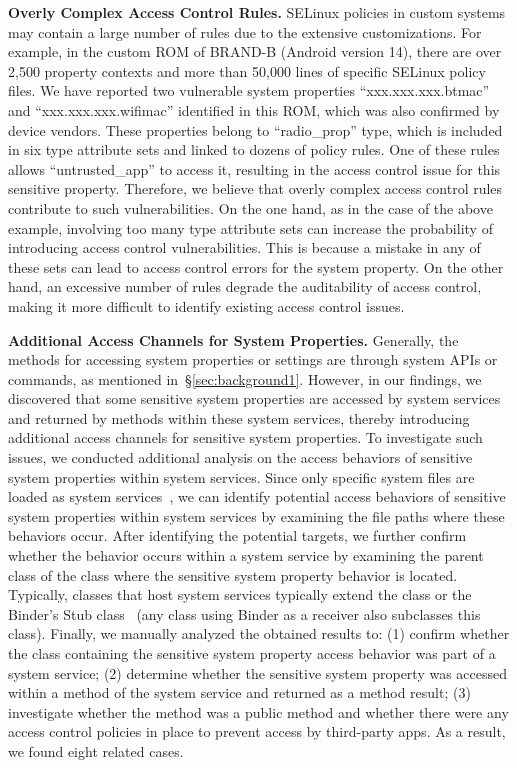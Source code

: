 \noindent \textbf{Overly Complex Access Control Rules.}
SELinux policies in custom systems may contain a large number of rules due to the extensive customizations.
For example, in the custom ROM of BRAND-B (Android version 14), there are over 2,500 property contexts and more than 50,000 lines of specific SELinux policy files.
We have reported two vulnerable system properties ``xxx.xxx.xxx.btmac'' and ``xxx.xxx.xxx.wifimac'' identified in this ROM, which was also confirmed by device vendors.
These properties belong to ``radio\_prop'' type, which is included in six type attribute sets and linked to dozens of policy rules.
One of these rules allows ``untrusted\_app'' to access it, resulting in the access control issue for this sensitive property.
Therefore, we believe that overly complex access control rules contribute to such vulnerabilities.
On the one hand, as in the case of the above example, involving too many type attribute sets can increase the probability of introducing access control vulnerabilities. 
This is because a mistake in any of these sets can lead to access control errors for the system property. 
On the other hand, an excessive number of rules degrade the auditability of access control, making it more difficult to identify existing access control issues.

\noindent \textbf{Additional Access Channels for System Properties.}
Generally, the methods for accessing system properties or settings are through system APIs or commands, as mentioned in~\S\ref{sec:background1}.
However, in our findings, we discovered that some sensitive system properties are accessed by system services and returned by methods within these system services, thereby introducing additional access channels for sensitive system properties.
To investigate such issues, we conducted additional analysis on the access behaviors of sensitive system properties within system services. 
Since only specific system files are loaded as system services~\cite{systemservice}, we can identify potential access behaviors of sensitive system properties within system services by examining the file paths where these behaviors occur.
After identifying the potential targets, we further confirm whether the behavior occurs within a system service by examining the parent class of the class where the sensitive system property behavior is located. 
Typically, classes that host system services typically extend the \texttt{} class or the Binder's Stub class~\cite{binder}  (any class using Binder as a receiver also subclasses this class).
Finally, we manually analyzed the obtained results to: 
(1) confirm whether the class containing the sensitive system property access behavior was part of a system service; 
(2) determine whether the sensitive system property was accessed within a method of the system service and returned as a method result; 
(3) investigate whether the method was a public method and whether there were any access control policies in place to prevent access by third-party apps.
As a result, we found eight related cases.

